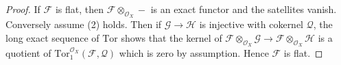 \documentclass[10pt,a4paper]{amsart}
\theoremstyle{plain}
\theoremstyle{definition}
\theoremstyle{remark}
\numberwithin{equation}{subsection}
\begin{document}
\begin{proof}
If $\mathcal{F}$ is flat, then $\mathcal{F} \otimes_{\mathcal{O}_X} -$
is an exact functor and the satellites vanish. Conversely assume (2)
holds. Then if $\mathcal{G} \to \mathcal{H}$ is injective with cokernel
$\mathcal{Q}$, the long exact sequence of $\text{Tor}$ shows that
the kernel of
$\mathcal{F} \otimes_{\mathcal{O}_X} \mathcal{G} \to
\mathcal{F} \otimes_{\mathcal{O}_X} \mathcal{H}$
is a quotient of
$\text{Tor}_1^{\mathcal{O}_X}(\mathcal{F}, \mathcal{Q})$
which is zero by assumption. Hence $\mathcal{F}$ is flat.
\end{proof}
\end{document}
